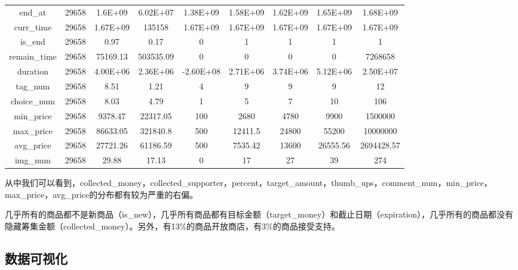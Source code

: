 \documentclass[lang=cn,a4paper]{elegantpaper}
\begin{document}
\begin{table}[!htbp]
\begin{tabular}{ccccccccc}
  end\_at&29658&1.6E+09&6.02E+07&1.38E+09&1.58E+09&1.62E+09&1.65E+09&1.68E+09\\
  curr\_time&29658&1.67E+09&135158&1.67E+09&1.67E+09&1.67E+09&1.67E+09&1.67E+09\\
  is\_end&29658&0.97&0.17&0&1&1&1&1\\
  remain\_time&29658&75169.13&503535.09&0&0&0&0&7268658\\
  duration&29658&4.00E+06&2.36E+06&-2.60E+08&2.71E+06&3.74E+06&5.12E+06&2.50E+07\\
  tag\_num&29658&8.51&1.21&4&9&9&9&12\\
  choice\_num&29658&8.03&4.79&1&5&7&10&106\\
  min\_price&29658&9378.47&22317.05&100&2680&4780&9900&1500000\\
  max\_price&29658&86633.05&321840.8&500&12411.5&24800&55200&10000000\\
  avg\_price&29658&27721.26&61186.59&500&7535.42&13600&26555.56&2694428.57\\
  img\_num&29658&29.88&17.13&0&17&27&39&274\\
  \bottomrule
  \end{tabular}
\label{tbl:描述性数据统计}
\end{table}

从中我们可以看到，collected\_money，collected\_supporter，percent，target\_amount，thumb\_ups，comment\_num，min\_price，max\_price，avg\_price的分布都有较为严重的右偏。

几乎所有的商品都不是新商品（is\_new），几乎所有商品都有目标金额（target\_money）和截止日期（expiration），几乎所有的商品都没有隐藏筹集金额（collected\_money）。另外，有13\%的商品开放商店，有3\%的商品接受支持。




\subsection{数据可视化}
\end{document}
